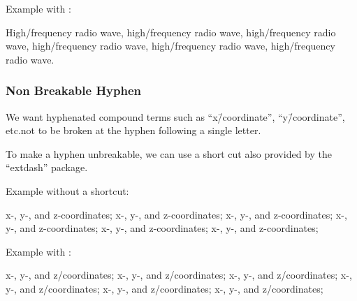 Example with \qco{\\-/}:

\begin{center}\begin{minipage}{2.6in}\vspace{0.6\baselineskip}
  High\-/frequency radio wave, high\-/frequency radio wave,
  high\-/frequency radio wave, high\-/frequency radio wave,
  high\-/frequency radio wave, high\-/frequency radio wave.
\vspace{0.6\baselineskip}\end{minipage}\end{center}

\subsubsection{Non Breakable Hyphen}
\label{sec:app:styleguide:Non Breakable Hyphen}

We want hyphenated compound terms such as ``x\=/coordinate'',
``y\=/coordinate'', etc.\@ not to be broken at the hyphen
following a single letter.

To make a hyphen unbreakable, we can use a short cut
\qco{\\=/} also provided by the ``extdash'' package.

Example without a shortcut:

\begin{center}\begin{minipage}{2.55in}\vspace{0.6\baselineskip}
x-, y-, and z-coordinates; x-, y-, and z-coordinates;
x-, y-, and z-coordinates; x-, y-, and z-coordinates;
x-, y-, and z-coordinates; x-, y-, and z-coordinates;
\vspace{0.6\baselineskip}\end{minipage}\end{center}

Example with \qco{\\-/}:

\begin{center}\begin{minipage}{2.55in}\vspace{0.6\baselineskip}
x-, y-, and z\-/coordinates; x-, y-, and z\-/coordinates;
x-, y-, and z\-/coordinates; x-, y-, and z\-/coordinates;
x-, y-, and z\-/coordinates; x-, y-, and z\-/coordinates;
\vspace{0.6\baselineskip}\end{minipage}\end{center}

